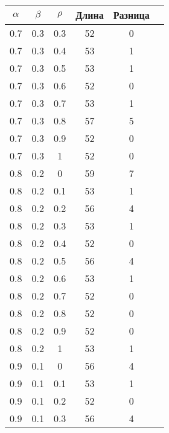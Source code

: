 \begin{table}[!h]
    \begin{center}
        \begin{tabular}{|c@{\hspace{7mm}}|c@{\hspace{7mm}}|c@{\hspace{7mm}}|c@{\hspace{7mm}}|c@{\hspace{7mm}}|c|}
            \hline
            $\alpha$ & $\beta$ & $\rho$ & Длина & Разница \\
            \hline
            0.7  & 0.3  & 0.3  & 52    & 0     \\
            0.7  & 0.3  & 0.4  & 53    & 1     \\
            0.7  & 0.3  & 0.5  & 53    & 1     \\
            0.7  & 0.3  & 0.6  & 52    & 0     \\
            0.7  & 0.3  & 0.7  & 53    & 1     \\
            0.7  & 0.3  & 0.8  & 57    & 5     \\
            0.7  & 0.3  & 0.9  & 52    & 0     \\
            0.7  & 0.3  & 1    & 52    & 0     \\
            0.8  & 0.2  & 0    & 59    & 7     \\
            0.8  & 0.2  & 0.1  & 53    & 1     \\
            0.8  & 0.2  & 0.2  & 56    & 4     \\
            0.8  & 0.2  & 0.3  & 53    & 1     \\
            0.8  & 0.2  & 0.4  & 52    & 0     \\
            0.8  & 0.2  & 0.5  & 56    & 4     \\
            0.8  & 0.2  & 0.6  & 53    & 1     \\
            0.8  & 0.2  & 0.7  & 52    & 0     \\
            0.8  & 0.2  & 0.8  & 52    & 0     \\
            0.8  & 0.2  & 0.9  & 52    & 0     \\
            0.8  & 0.2  & 1    & 53    & 1     \\
            0.9  & 0.1  & 0    & 56    & 4     \\
            0.9  & 0.1  & 0.1  & 53    & 1     \\
            0.9  & 0.1  & 0.2  & 52    & 0     \\
            0.9  & 0.1  & 0.3  & 56    & 4     \\

\end{tabular}
\end{center}
\end{table}
